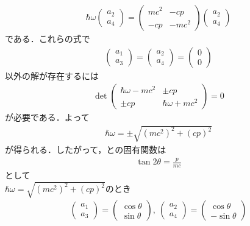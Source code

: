 \documentclass{report}
\begin{document}
\begin{align}
  \label{down-spin}
  \hbar \omega
  \begin{pmatrix}
    a_2\\a_4
  \end{pmatrix}
    =
    \begin{pmatrix}
      mc^2 & -cp\\
      -cp & -mc^2
    \end{pmatrix}
    \begin{pmatrix}
      a_2\\a_4
    \end{pmatrix}
\end{align}
である．これらの式で
\begin{align}
  \begin{pmatrix}
    a_1\\a_3
  \end{pmatrix}
  =
  \begin{pmatrix}
    a_2\\a_4
  \end{pmatrix}
  =
  \begin{pmatrix}
    0\\0
  \end{pmatrix}
\end{align}
以外の解が存在するには
\begin{align}
  \det
  \begin{pmatrix}
    \hbar \omega - mc^2 & \pm cp\\
    \pm cp & \hbar\omega + mc^2
  \end{pmatrix}
  =0
\end{align}
が必要である．よって
\begin{align}
  \hbar \omega = \pm \sqrt{(mc^2)^2 + (cp)^2}
\end{align}
が得られる．したがって，との固有関数は
\begin{align}
  \tan 2\theta = \frac{p}{mc}
\end{align}
として\\
$\hbar\omega = \sqrt{(mc^2)^2 + (cp)^2}$のとき
\begin{align}
  \begin{pmatrix}
    a_1\\a_3
  \end{pmatrix}
  =
  \begin{pmatrix}
    \cos\theta\\\sin\theta
  \end{pmatrix}
  ,\ 
  \begin{pmatrix}
    a_2\\a_4
  \end{pmatrix}
  =
  \begin{pmatrix}
    \cos\theta\\-\sin\theta
  \end{pmatrix}
\end{align}
\end{document}

